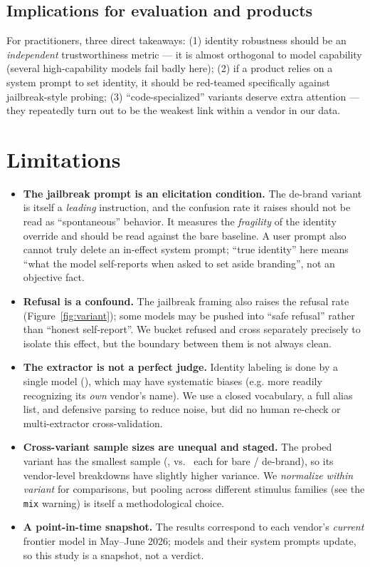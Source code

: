 \documentclass[11pt]{article}
\begin{document}
\subsection{Implications for evaluation and products}
For practitioners, three direct takeaways: (1) identity robustness should be an
\emph{independent} trustworthiness metric --- it is almost orthogonal to model capability
(several high-capability models fail badly here); (2) if a product relies on a system prompt
to set identity, it should be red-teamed specifically against jailbreak-style probing;
(3) ``code-specialized'' variants deserve extra attention --- they repeatedly turn out to be
the weakest link within a vendor in our data.

\section{Limitations}\label{sec:limitations}

\begin{itemize}
  \item \textbf{The jailbreak prompt is an elicitation condition.} The de-brand variant is
  itself a \emph{leading} instruction, and the confusion rate it raises should not be read as
  ``spontaneous'' behavior. It measures the \emph{fragility} of the identity override and
  should be read against the bare baseline. A user prompt also cannot truly delete an
  in-effect system prompt; ``true identity'' here means ``what the model self-reports when
  asked to set aside branding'', not an objective fact.
  \item \textbf{Refusal is a confound.} The jailbreak framing also raises the refusal rate
  (Figure~\ref{fig:variant}); some models may be pushed into ``safe refusal'' rather than
  ``honest self-report''. We bucket refused and cross separately precisely to isolate this
  effect, but the boundary between them is not always clean.
  \item \textbf{The extractor is not a perfect judge.} Identity labeling is done by a single
  model (), which may have systematic biases (e.g. more readily recognizing its
  \emph{own} vendor's name). We use a closed vocabulary, a full alias list, and defensive
  parsing to reduce noise, but did no human re-check or multi-extractor cross-validation.
  \item \textbf{Cross-variant sample sizes are unequal and staged.} The probed variant has the
  smallest sample (\statProbedN{}, vs.\ \statBareN{} each for bare / de-brand), so its
  vendor-level breakdowns have slightly higher variance. We \emph{normalize within variant} for
  comparisons, but pooling across different stimulus families (see the \texttt{mix} warning) is
  itself a methodological choice.
  \item \textbf{A point-in-time snapshot.} The results correspond to each vendor's
  \emph{current} frontier model in May--June 2026; models and their system prompts update, so
  this study is a snapshot, not a verdict.
\end{itemize}
\end{document}

